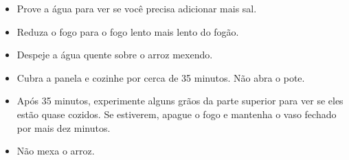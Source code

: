\documentclass [11pt, letterpaper] {article}
\begin{document}
\begin {description}
\begin {enumerate}
\begin {itemize}
\item Prove a água para ver se você precisa adicionar mais sal.
\item Reduza o fogo para o fogo lento mais lento do fog\~ao.
\item Despeje a água quente sobre o arroz mexendo.
\item Cubra a panela e cozinhe por cerca de 35 minutos. Não abra o pote.
\item Após 35 minutos, experimente alguns grãos da parte superior para ver se eles estão quase cozidos. Se estiverem, apague o fogo e mantenha o vaso fechado por mais dez minutos.
\item Não mexa o arroz.
\end {itemize}

\end {enumerate}
\end {description}
\end{document}
